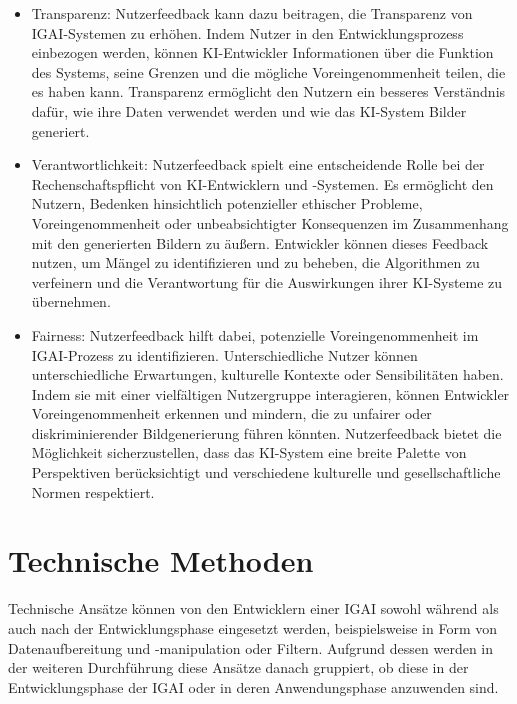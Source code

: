 \documentclass[12pt]{report}
\begin{document}
\begin{itemize}
	\item Transparenz: Nutzerfeedback kann dazu beitragen, die Transparenz von \ac{IGAI}-Systemen zu erhöhen. Indem Nutzer in den Entwicklungsprozess einbezogen werden, können KI-Entwickler Informationen über die Funktion des Systems, seine Grenzen und die mögliche Voreingenommenheit teilen, die es haben kann. Transparenz ermöglicht den Nutzern ein besseres Verständnis dafür, wie ihre Daten verwendet werden und wie das \ac{KI}-System Bilder generiert.
	\item Verantwortlichkeit: Nutzerfeedback spielt eine entscheidende Rolle bei der Rechenschaftspflicht von \ac{KI}-Entwicklern und -Systemen. Es ermöglicht den Nutzern, Bedenken hinsichtlich potenzieller ethischer Probleme, Voreingenommenheit oder unbeabsichtigter Konsequenzen im Zusammenhang mit den generierten Bildern zu äußern. Entwickler können dieses Feedback nutzen, um Mängel zu identifizieren und zu beheben, die Algorithmen zu verfeinern und die Verantwortung für die Auswirkungen ihrer \ac{KI}-Systeme zu übernehmen.
	\item Fairness: Nutzerfeedback hilft dabei, potenzielle Voreingenommenheit im \ac{IGAI}-Prozess zu identifizieren. Unterschiedliche Nutzer können unterschiedliche Erwartungen, kulturelle Kontexte oder Sensibilitäten haben. Indem sie mit einer vielfältigen Nutzergruppe interagieren, können Entwickler Voreingenommenheit erkennen und mindern, die zu unfairer oder diskriminierender Bildgenerierung führen könnten. Nutzerfeedback bietet die Möglichkeit sicherzustellen, dass das KI-System eine breite Palette von Perspektiven berücksichtigt und verschiedene kulturelle und gesellschaftliche Normen respektiert.
\end{itemize}


\section{Technische Methoden}

Technische Ansätze können von den Entwicklern einer \ac{IGAI} sowohl während als auch nach der Entwicklungsphase eingesetzt werden, beispielsweise in Form von Datenaufbereitung und -manipulation oder Filtern. Aufgrund dessen werden in der weiteren Durchführung diese Ansätze danach gruppiert, ob diese in der Entwicklungsphase der \ac{IGAI} oder in deren Anwendungsphase anzuwenden sind.
\end{document}
